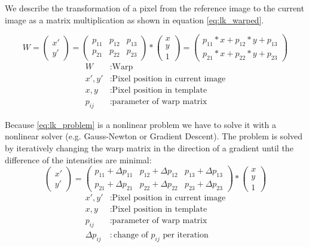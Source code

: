 \documentclass[11pt,a4paper,titlepage,oneside]{report}
\begin{document}
We describe the transformation of a pixel from the reference image to the current image as a matrix multiplication as shown in equation \ref{eq:lk_warped}.

\begin{equation}\label{eq:lk_warped}
	W=
	\begin{pmatrix}
		x' \\
		y'
	\end{pmatrix}=
	\begin{pmatrix}
		p_{11} & p_{12} & p_{13} \\
		p_{21} & p_{22} & p_{23}
	\end{pmatrix}*
	\begin{pmatrix}
		x\\
		y\\
		1
	\end{pmatrix}=
	\begin{pmatrix}
		p_{11}*x + p_{12}*y + p_{13} \\
		p_{21}*x + p_{22}*y + p_{23}
	\end{pmatrix}
\end{equation}
\begin{align*}
	W					&:	\text{Warp}\\
	x',y'			&:	\text{Pixel position in current image}\\
	x,y				&:	\text{Pixel position in template}\\
	p_{ij}		&:	\text{parameter of warp matrix}
\end{align*}

Because \ref{eq:lk_problem} is a nonlinear problem we have to solve it with a nonlinear solver (e.g. Gauss-Newton or Gradient Descent). The problem is solved by iteratively changing the warp matrix in the direction of a gradient until the difference of the intensities are minimal:
\begin{equation}
	\begin{pmatrix}
		x' \\
		y'
	\end{pmatrix}=
	\begin{pmatrix}
		p_{11}+\Delta p_{11} & p_{12}+\Delta p_{12} & p_{13}+\Delta p_{13} \\
		p_{21}+\Delta p_{21} & p_{22}+\Delta p_{22} & p_{23}+\Delta p_{23}
	\end{pmatrix}*
	\begin{pmatrix}
		x\\
		y\\
		1
	\end{pmatrix}
\end{equation}
\begin{align*}
	x',y'					&:	\text{Pixel position in current image}\\
	x,y						&:	\text{Pixel position in template}\\
	p_{ij}				&:	\text{parameter of warp matrix}\\
	\Delta p_{ij}	&:	\text{change of $p_{ij}$ per iteration}
\end{align*}
\end{document}
